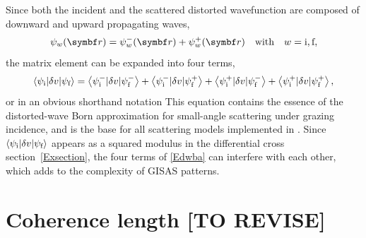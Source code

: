 Since both the incident
and the scattered distorted wavefunction
are composed of downward and upward propagating waves,
\begin{equation}\label{Epsipm}
  \psi_w(\r)
  = \psi^-_w(\r) + \psi^+_w(\r)
  \quad\text{with}\quad
  w=\ti,\tf,
\end{equation}
%
the matrix element can be expanded into four terms,
\begin{equation}\label{Edwba4}
  \left\langle \psi_{\text{i}}|\delta v|\psi_{\text{f}}\right\rangle
  = \left\langle \psi^-_{\text{i}}|\delta v|\psi^-_{\text{f}}\right\rangle
  + \left\langle \psi^-_{\text{i}}|\delta v|\psi^+_{\text{f}}\right\rangle
  + \left\langle \psi^+_{\text{i}}|\delta v|\psi^-_{\text{f}}\right\rangle
  + \left\langle \psi^+_{\text{i}}|\delta v|\psi^+_{\text{f}}\right\rangle,
\end{equation}
%
%
or in an obvious shorthand notation
This equation contains the essence of
the distorted-wave Born approximation
for small-angle scattering under grazing incidence,
and is the base for all scattering models implemented in \BornAgain.
Since $\left\langle \psi_{\text{i}}|\delta v|\psi_{\text{f}}\right\rangle$
appears as a squared modulus
in the differential cross section~\cref{Exsection},
the four terms of \cref{Edwba} can interfere with each other,
which adds to the complexity of GISAS patterns.

%


\section{Coherence length [TO REVISE]}\label{Scoherlen}

